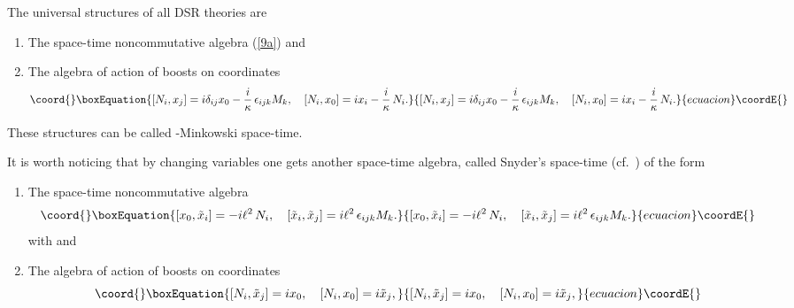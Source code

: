 \documentclass[a4paper,a4paper]{article}
\begin{document}
The universal structures of all DSR theories are

\begin{enumerate}
\item The space-time noncommutative algebra (\ref{9a}) and
\item The algebra of action of boosts on coordinates
\begin{equation}\coord{}\boxEquation{\label{10}
[N_i, x_j] = i \delta_{ij} x_0 - \frac{i}\kappa\, \epsilon_{ijk} M_k, \quad [N_i, x_0] = i x_{i} - \frac{i}\kappa\, N_i.
}{[N_i, x_j] = i \delta_{ij} x_0 - \frac{i}\kappa\, \epsilon_{ijk} M_k, \quad [N_i, x_0] = i x_{i} - \frac{i}\kappa\, N_i.
}{ecuacion}\coordE{}\end{equation}
\end{enumerate}
These structures can be called \myHighlight{$\kappa$}\coordHE{}-Minkowski space-time.


It is worth noticing that by changing variables \coordHE{} one gets another space-time algebra, called Snyder's space-time (cf.~\cite{snyder}) of the form
\begin{enumerate}
\item The space-time noncommutative algebra 
\begin{equation}\coord{}\boxEquation{\label{11}
 [x_0, \tilde{x}_i] = - i\ell^2 \, N_i, \quad [\tilde{x}_i, \tilde{x}_j] =  i\ell^2 \,\epsilon_{ijk} M_k.
}{[x_0, \tilde{x}_i] = - i\ell^2 \, N_i, \quad [\tilde{x}_i, \tilde{x}_j] =  i\ell^2 \,\epsilon_{ijk} M_k.
}{ecuacion}\coordE{}\end{equation}
with \coordHE{} and
\item The algebra of action of boosts on coordinates
\begin{equation}\coord{}\boxEquation{\label{12}
[N_i, \tilde{x}_j] = i x_0, \quad [N_i, x_0]= i \tilde{x}_j,
}{[N_i, \tilde{x}_j] = i x_0, \quad [N_i, x_0]= i \tilde{x}_j,
}{ecuacion}\coordE{}\end{equation}
\end{enumerate}
\end{document}
